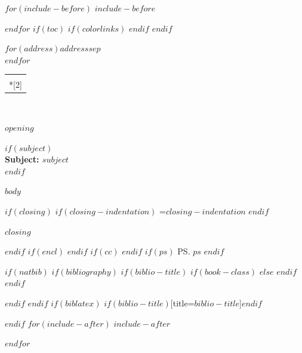 \documentclass[$if(fontsize)$$fontsize$,$endif$$if(lang)$$babel-lang$,$endif$$if(papersize)$$papersize$paper,$endif$$for(classoption)$$classoption$$sep$,$endfor$]{letter}
\date{$date$}
\makeatletter
\renewcommand*{\opening}[1]{\ifx\@empty\fromaddress
  \thispagestyle{firstpage}%
    {\raggedleft\@date\par}%
  \else  %
    \thispagestyle{empty}%
    {\raggedleft\begin{tabular}{l@{}}\ignorespaces
      \fromaddress \\*[2\parskip]%
      \end{tabular}\par
     \raggedright\@date\par}%
  \fi
  \vspace{2\parskip}%
  {\raggedright \toname \\ \toaddress \par}%
  \vspace{2\parskip}%
  #1\par\nobreak}
\makeatother
\begin{document}
$for(include-before)$
$include-before$

$endfor$
$if(toc)$
{
	$if(colorlinks)$
	\hypersetup{linkcolor=$if(toccolor)$$toccolor$$else$$endif$}
	$endif$
	\setcounter{tocdepth}{$toc-depth$}
	\tableofcontents
}
$endif$

\begin{letter}
	{$for(address)$$address$$sep$\\$endfor$}
	\opening{$opening$}

	$if(subject)$
	\textbf{\\Subject: $subject$\\}
	$endif$

	$body$

	$if(closing)$
	$if(closing-indentation)$
	\longindentation=$closing-indentation$
	$endif$
	\closing{$closing$}
	$endif$
	$if(encl)$
	$endif$
	$if(cc)$
	$endif$
	$if(ps)$
	\ps{$ps$}
	$endif$

\end{letter}

$if(natbib)$
$if(bibliography)$
$if(biblio-title)$
$if(book-class)$
\renewcommand\bibname{$biblio-title$}
$else$
\renewcommand\refname{$biblio-title$}
$endif$
$endif$


$endif$
$endif$
$if(biblatex)$
\printbibliography$if(biblio-title)$[title=$biblio-title$]$endif$

$endif$
$for(include-after)$
$include-after$

$endfor$
\end{document}
